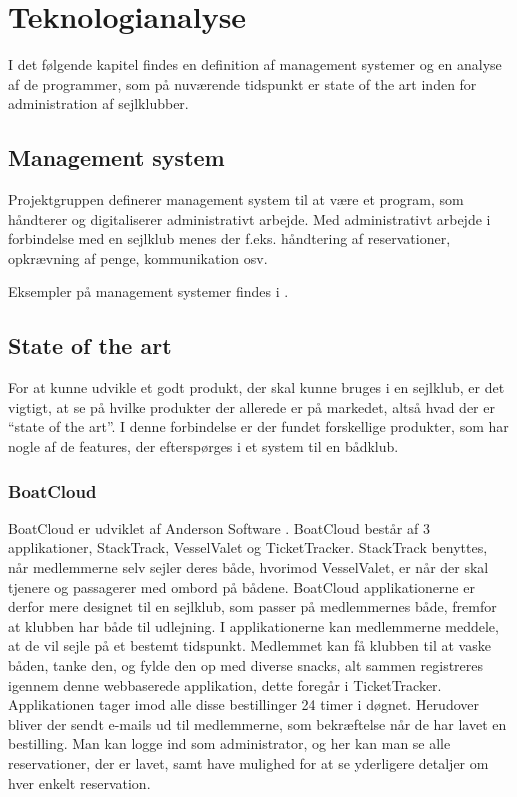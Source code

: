 \chapter{Teknologianalyse}\label{chap:teknologi-analyse}

I det følgende kapitel findes en definition af management systemer og en analyse af de programmer, som på nuværende tidspunkt er state of the art inden for administration af sejlklubber.

\section{Management system}\label{subsec:management-systemer}
Projektgruppen definerer management system til at være et program, som håndterer og digitaliserer administrativt arbejde.
Med administrativt arbejde i forbindelse med en sejlklub menes der f.eks. håndtering af reservationer, opkrævning af penge, kommunikation osv.

Eksempler på management systemer findes i .

\section{State of the art}\label{sec:sota}

For at kunne udvikle et godt produkt, der skal kunne bruges i en sejlklub, er det vigtigt, at se på hvilke produkter der allerede er på markedet, altså hvad der er ``state of the art''. 
I denne forbindelse er der fundet forskellige produkter, som har nogle af de features, der efterspørges i et system til en bådklub.


\subsection*{BoatCloud}

BoatCloud er udviklet af Anderson Software \citep{BoatCloud}.
BoatCloud består af 3 applikationer, StackTrack, VesselValet og TicketTracker.
StackTrack benyttes, når medlemmerne selv sejler deres både, hvorimod VesselValet, er når der skal tjenere og passagerer med ombord på bådene. 
BoatCloud applikationerne er derfor mere designet til en sejlklub, som passer på medlemmernes både, fremfor at klubben har både til udlejning. 
I applikationerne kan medlemmerne meddele, at de vil sejle på et bestemt tidspunkt. 
Medlemmet kan få klubben til at vaske båden, tanke den, og fylde den op med diverse snacks, alt sammen registreres igennem denne webbaserede applikation, dette foregår i TicketTracker. 
Applikationen tager imod alle disse bestillinger 24 timer i døgnet. 
Herudover bliver der sendt e-mails ud til medlemmerne, som bekræftelse når de har lavet en bestilling.
Man kan logge ind som administrator, og her kan man se alle reservationer, der er lavet, samt have mulighed for at se yderligere detaljer om hver enkelt reservation.



